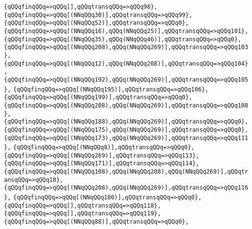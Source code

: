 \verb|{qQQqfinqQQq=>qQQq[],qQQqtransqQQq=>qQQq98},|\newline
\verb|{qQQqfinqQQq=>qQQq[(NNqQQq30)],qQQqtransqQQq=>qQQq99},|\newline
\verb|{qQQqfinqQQq=>qQQq[(NNqQQq52)],qQQqtransqQQq=>qQQq0},|\newline
\verb|{qQQqfinqQQq=>qQQq[(NNqQQq16),qQQq(NNqQQq25)],qQQqtransqQQq=>qQQq101},|\newline
\verb|{qQQqfinqQQq=>qQQq[(NNqQQq35),qQQq(NNqQQq46)],qQQqtransqQQq=>qQQq0},|\newline
\verb|{qQQqfinqQQq=>qQQq[(NNqQQq208),qQQq(NNqQQq269)],qQQqtransqQQq=>qQQq103},|\newline
\verb|{qQQqfinqQQq=>qQQq[(NNqQQq12),qQQq(NNqQQq208)],qQQqtransqQQq=>qQQq104},|\newline
\verb|{qQQqfinqQQq=>qQQq[(NNqQQq192),qQQq(NNqQQq269)],qQQqtransqQQq=>qQQq105},|\newline
\verb|{qQQqfinqQQq=>qQQq[(NNqQQq195)],qQQqtransqQQq=>qQQq106},|\newline
\verb|{qQQqfinqQQq=>qQQq[(NNqQQq199)],qQQqtransqQQq=>qQQq0},|\newline
\verb|{qQQqfinqQQq=>qQQq[(NNqQQq208),qQQq(NNqQQq269)],qQQqtransqQQq=>qQQq108},|\newline
\verb|{qQQqfinqQQq=>qQQq[(NNqQQq188),qQQq(NNqQQq269)],qQQqtransqQQq=>qQQq0},|\newline
\verb|{qQQqfinqQQq=>qQQq[(NNqQQq175),qQQq(NNqQQq269)],qQQqtransqQQq=>qQQq0},|\newline
\verb|{qQQqfinqQQq=>qQQq[(NNqQQq173),qQQq(NNqQQq269)],qQQqtransqQQq=>qQQq111},|\newline
\verb|{qQQqfinqQQq=>qQQq[(NNqQQq8)],qQQqtransqQQq=>qQQq0},|\newline
\verb|{qQQqfinqQQq=>qQQq[(NNqQQq269)],qQQqtransqQQq=>qQQq113},|\newline
\verb|{qQQqfinqQQq=>qQQq[(NNqQQq171)],qQQqtransqQQq=>qQQq114},|\newline
\verb|{qQQqfinqQQq=>qQQq[(NNqQQq108),qQQq(NNqQQq208),qQQq(NNqQQq269)],qQQqtransqQQq=>qQQq10},|\newline
\verb|{qQQqfinqQQq=>qQQq[(NNqQQq208),qQQq(NNqQQq269)],qQQqtransqQQq=>qQQq116},|\newline
\verb|{qQQqfinqQQq=>qQQq[(NNqQQq180)],qQQqtransqQQq=>qQQq0},|\newline
\verb|{qQQqfinqQQq=>qQQq[],qQQqtransqQQq=>qQQq118},|\newline
\verb|{qQQqfinqQQq=>qQQq[],qQQqtransqQQq=>qQQq119},|\newline
\verb|{qQQqfinqQQq=>qQQq[(NNqQQq88)],qQQqtransqQQq=>qQQq0},|\newline

